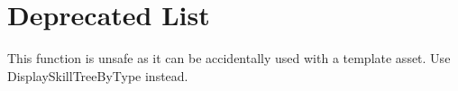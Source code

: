 \chapter{Deprecated List}
\hypertarget{deprecated}{}\label{deprecated}

\begin{DoxyRefList}
\item[Member \doxylink{classUCrimsonSkillTreeWidget__Display_afd589470d0f0f4c4278fd6094de9f4a8}{UCrimson\+Skill\+Tree\+Widget\+\_\+\+Display\+::Set\+Skill\+Tree} (\doxylink{classUCrimsonSkillTree}{UCrimson\+Skill\+Tree} \texorpdfstring{$\ast$}{*}\+In\+Skill\+Tree)]\label{deprecated__deprecated000001}%
%
This function is unsafe as it can be accidentally used with a template asset. Use Display\+Skill\+Tree\+By\+Type instead. 
\end{DoxyRefList}